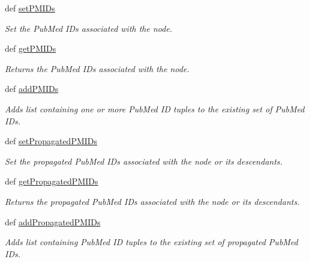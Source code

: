 \begin{DoxyCompactItemize}
def \hyperlink{class_g_o_node_1_1_g_o_node_a10057f8adee9667f95efdc80ed579b8f}{setPMIDs}
\begin{DoxyCompactList}\small\item\em Set the PubMed IDs associated with the node. \item\end{DoxyCompactList}\item 
def \hyperlink{class_g_o_node_1_1_g_o_node_a8842d1581fd69a9e9fd40a497a8437f0}{getPMIDs}
\begin{DoxyCompactList}\small\item\em Returns the PubMed IDs associated with the node. \item\end{DoxyCompactList}\item 
def \hyperlink{class_g_o_node_1_1_g_o_node_a7f0ddc017e84fe50a430a3896cfb0296}{addPMIDs}
\begin{DoxyCompactList}\small\item\em Adds list containing one or more PubMed ID tuples to the existing set of PubMed IDs. \item\end{DoxyCompactList}\item 
def \hyperlink{class_g_o_node_1_1_g_o_node_ad6bf7ed6335e6ae280072b9566d39d7f}{setPropagatedPMIDs}
\begin{DoxyCompactList}\small\item\em Set the propagated PubMed IDs associated with the node or its descendants. \item\end{DoxyCompactList}\item 
def \hyperlink{class_g_o_node_1_1_g_o_node_a8e10409df23065fe586b7fd9c90dd84f}{getPropagatedPMIDs}
\begin{DoxyCompactList}\small\item\em Returns the propagated PubMed IDs associated with the node or its descendants. \item\end{DoxyCompactList}\item 
def \hyperlink{class_g_o_node_1_1_g_o_node_ab929234558a485675999c90dc4993e4d}{addPropagatedPMIDs}
\begin{DoxyCompactList}\small\item\em Adds list containing PubMed ID tuples to the existing set of propagated PubMed IDs. \item\end{DoxyCompactList}\item 

\end{DoxyCompactItemize}
